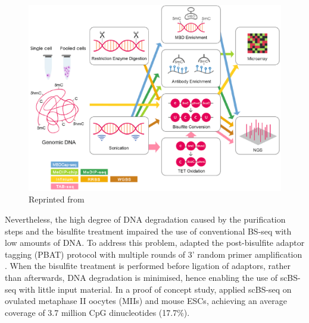 \begin{figure}[H]
	\centering
	\includegraphics[width=1.0\linewidth]{methylation_protocols}
	\caption[Workflow of DNA methylation profiling protocols]{Reprinted from \cite{Yong et al}}
	\label{fig:methylation_protocols}
\end{figure}

Nevertheless, the high degree of DNA degradation caused by the purification steps and the bisulfite treatment impaired the use of conventional BS-seq with low amounts of DNA. To address this problem, \cite{Smallwood2014} adapted the post-bisulfite adaptor tagging (PBAT) protocol with multiple rounds of 3' random primer amplification . When the bisulfite treatment is performed before ligation of adaptors, rather than afterwards, DNA degradation is minimised, hence enabling the use of scBS-seq with little input material.
In a proof of concept study, \cite{Smallwood2014} applied scBS-seq on ovulated metaphase II oocytes (MIIs) and mouse ESCs, achieving an average coverage of 3.7 million CpG dinucleotides (17.7\%).\\

